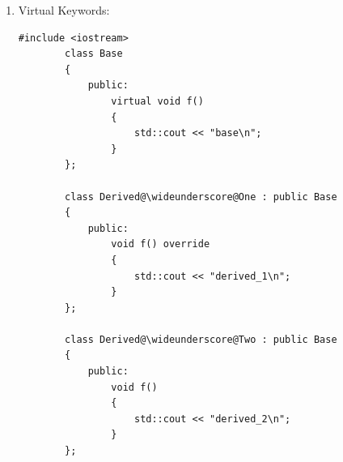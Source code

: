 \documentclass{article}
\begin{document}
\begin{enumerate}[label=(\alph*), itemsep = 120pt]
\begin{lstlisting}[style = CStyle]
        company@\wideunderscore@ * current = gabriel@\wideunderscore@company->company@\wideunderscore@head;
        for (int i = 0; i < @\rule{1in}{0.5pt}@; i++) //iteraite through the list
        { 
            printf("%c", @\rule{1in}{0.5pt}@); //print the current character
            @\rule{1in}{0.5pt}@ //move the current node
        }
    \end{lstlisting}
    
    Gabriel is quite shy and doesn't want anyone to know what his favorite Fortune 500 company is (except for you, his best friend). \textbf{Help him finish the below code to remove the company name from the heap.}

    Part 2: Freeing
    \begin{lstlisting}[style = CStyle]
        company@\wideunderscore@node * the@\wideunderscore@current = gabriel@\wideunderscore@company->company@\wideunderscore@head;
        company@\wideunderscore@node the@\wideunderscore@previous = gabriel@\wideunderscore@company->company@\wideunderscore@head;
        while(the@\wideunderscore@current->next != @\rule{2in}{0.5pt}@){
            the@\wideunderscore@current = the@\wideunderscore@current->next;
            free(@\rule{2in}{0.5pt}@);
            @\rule{2in}{0.5pt}@; //move previous further
        }

        free(gabriel@\wideunderscore@company);
    \end{lstlisting}

    Whenever the above code is executed, a memory leak occurs. \textbf{Explain what a memory leak is and come up with one line of code that can be added above to fix the memory leak.}

    \item Virtual Keywords:
    \begin{lstlisting}[style = CStyle]
        #include <iostream>
        class Base
        {
            public: 
                virtual void f()
                {
                    std::cout << "base\n";
                }
        };

        class Derived@\wideunderscore@One : public Base
        {
            public:
                void f() override
                {
                    std::cout << "derived_1\n";
                }
        };

        class Derived@\wideunderscore@Two : public Base 
        {
            public: 
                void f()
                {
                    std::cout << "derived_2\n";
                }
        };


\end{lstlisting}
\end{enumerate}
\end{document}
